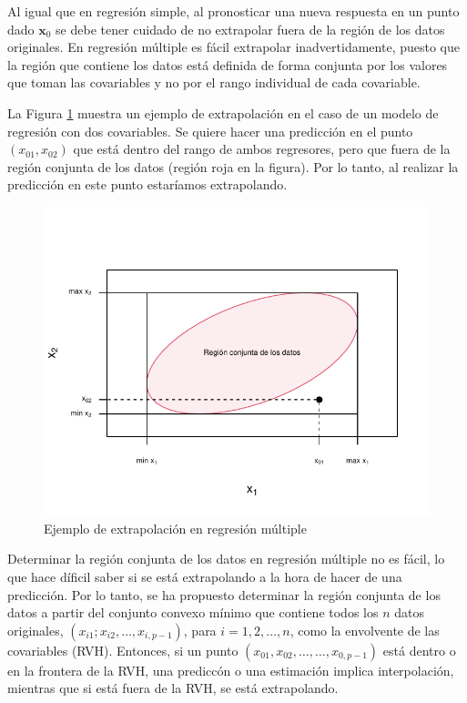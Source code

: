 \documentclass[
]{article}
\begin{document}
Al igual que en regresión simple, al pronosticar una nueva respuesta en un punto dado \(\boldsymbol x_{0}\) se debe tener cuidado de no extrapolar fuera de la región de los datos originales. En regresión múltiple es fácil extrapolar inadvertidamente, puesto que la región que contiene los datos está definida de forma conjunta por los valores que toman las covariables y no por el rango individual de cada covariable.

La Figura \ref{fig:extrapolacionOculta} muestra un ejemplo de extrapolación en el caso de un modelo de regresión con dos covariables. Se quiere hacer una predicción en el punto \((x_{01},x_{02})\) que está dentro del rango de ambos regresores, pero que fuera de la región conjunta de los datos (región roja en la figura). Por lo tanto, al realizar la predicción en este punto estaríamos extrapolando.

\begin{figure}

{\centering \includegraphics{MLG1_files/figure-latex/extrapolacionOculta-1} 

}

\caption{Ejemplo de extrapolación en regresión múltiple}\label{fig:extrapolacionOculta}
\end{figure}

Determinar la región conjunta de los datos en regresión múltiple no es fácil, lo que hace díficil saber si se está extrapolando a la hora de hacer de una predicción. Por lo tanto, se ha propuesto determinar la región conjunta de los datos a partir del conjunto convexo mínimo que contiene todos los \(n\) datos originales, \((x_{i1}; x_{i2},\ldots,x_{i,p-1})\), para \(i = 1,2,\ldots,n\), como la envolvente de las covariables (RVH). Entonces, si un punto \((x_{01},x_{02}, \ldots,\ldots, x_{0,p-1})\) está dentro o en la frontera de la RVH, una prediccón o una estimación implica interpolación, mientras que si está fuera de la RVH, se está extrapolando.
\end{document}
